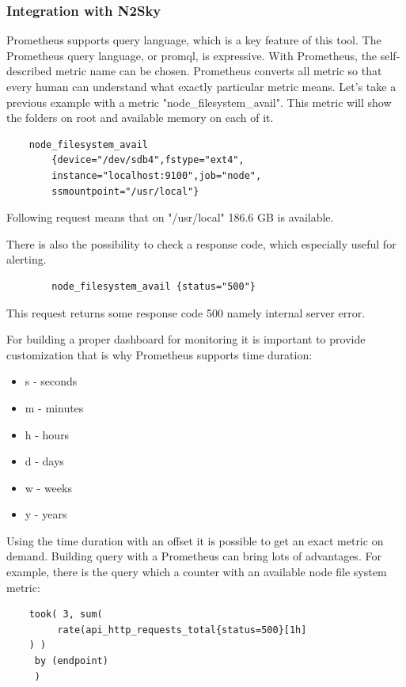 \subsubsection{Integration with N2Sky}\label{Integration with N2Sky}

Prometheus supports query language, which is a key feature of this tool. The Prometheus query language, or promql, is expressive. 
With Prometheus, the self-described metric name can be chosen. Prometheus converts all metric so that every human can understand what exactly particular metric means. Let's take a previous example with a metric "node\_filesystem\_avail". This metric will show the folders on root and available memory on each of it.

\begin{lstlisting}
    node_filesystem_avail 
        {device="/dev/sdb4",fstype="ext4",
        instance="localhost:9100",job="node",
        ssmountpoint="/usr/local"}
\end{lstlisting}

Following request means that on "/usr/local" 186.6 GB is available. 

There is also the possibility to check a response code, which especially useful for alerting. 

\begin{lstlisting}
        node_filesystem_avail {status="500"}
\end{lstlisting}

This request returns some response code 500 namely internal server error. 

For building a proper dashboard for monitoring it is important to provide customization that is why Prometheus supports time duration:

\begin{itemize}
\item s - seconds
\item m - minutes
\item h - hours
\item d - days
\item w - weeks
\item y - years
\end{itemize}

Using the time duration with an offset it is possible to get an exact metric on demand. 
Building query with a Prometheus can bring lots of advantages. For example, there is the query which  a counter with an available node file system metric:

\begin{lstlisting}
    took( 3, sum(
         rate(api_http_requests_total{status=500}[1h]
    ) )
     by (endpoint)
     )
\end{lstlisting}

